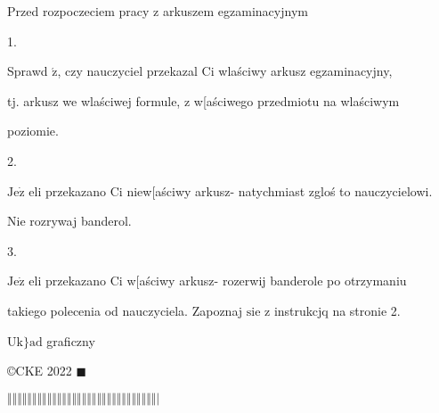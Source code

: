 \documentclass[a4paper,12pt]{article}
\begin{document}
Przed rozpoczeciem pracy z arkuszem egzaminacyjnym

1.

Sprawd $\acute{\mathrm{z}}$, czy nauczyciel przekazal Ci wlaściwy arkusz egzaminacyjny,

tj. arkusz we wlaściwej formule, z w[aściwego przedmiotu na wlaściwym

poziomie.

2.

$\mathrm{J}\mathrm{e}\dot{\mathrm{z}}$ eli przekazano Ci niew[aściwy arkusz- natychmiast zgloś to nauczycielowi.

Nie rozrywaj banderol.

3.

$\mathrm{J}\mathrm{e}\dot{\mathrm{z}}$ eli przekazano Ci w[aściwy arkusz- rozerwij banderole po otrzymaniu

takiego polecenia od nauczyciela. Zapoznaj $\mathrm{s}\mathrm{i}\mathrm{e}$ z instrukcjq na stronie 2.

$\mathrm{U}\mathrm{k}\}\mathrm{a}\mathrm{d}$ graficzny

\copyright CKE 2022 $\blacksquare$

$\Vert\Vert\Vert\Vert\Vert\Vert\Vert\Vert\Vert\Vert\Vert\Vert\Vert\Vert\Vert\Vert\Vert\Vert\Vert\Vert\Vert\Vert\Vert\Vert\Vert\Vert\Vert\Vert\Vert\Vert|$
\end{document}

